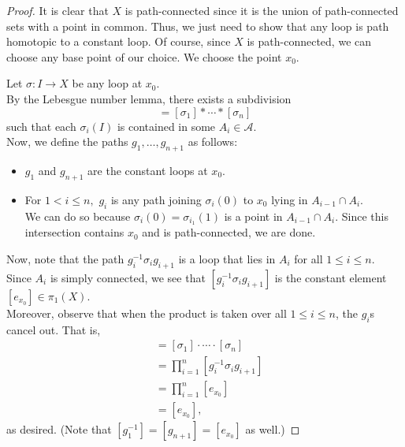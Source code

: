 \documentclass[12pt]{article}
\theoremstyle{definition}
\numberwithin{thm}{section}
\begin{document}
\begin{proof} 
	It is clear that $X$ is path-connected since it is the union of path-connected sets with a point in common. Thus, we just need to show that any loop is path homotopic to a constant loop. Of course, since $X$ is path-connected, we can choose any base point of our choice. We choose the point $x_0.$ 

	Let $\sigma:I \to X$ be any loop at $x_0.$\\
	By the Lebesgue number lemma, there exists a subdivision
	\begin{equation*} 
		[\sigma] = [\sigma_1]*\cdots*[\sigma_n]
	\end{equation*}
	such that each $\sigma_i(I)$ is contained in some $A_i \in \mathcal{A}.$ \\
	Now, we define the paths $g_1, \ldots, g_{n+1}$ as follows:
	\begin{itemize}
		\item $g_1$ and $g_{n+1}$ are the constant loops at $x_0.$
		\item For $1 < i \le n,$ $g_i$ is any path joining $\sigma_i(0)$ to $x_0$ lying in $A_{i-1} \cap A_i.$ \\
		We can do so because $\sigma_i(0) = \sigma_{i_1}(1)$ is a point in $A_{i-1} \cap A_i.$ Since this intersection contains $x_0$ and is path-connected, we are done.
	\end{itemize}
	Now, note that the path $g_i^{-1}\sigma_ig_{i+1}$ is a loop that lies in $A_i$ for all $1 \le i \le n.$ Since $A_i$ is simply connected, we see that $[g_i^{-1}\sigma_ig_{i+1}]$ is the constant element $[e_{x_0}] \in \pi_1(X).$\\
	Moreover, observe that when the product is taken over all $1 \le i \le n$, the $g_i$s cancel out. That is,
	\begin{align*} 
		[\sigma] &= [\sigma_1]\cdot\cdots\cdot[\sigma_n]\\
		&= \prod_{i = 1}^{n}[g_i^{-1}\sigma_ig_{i+1}]\\
		&= \prod_{i = 1}^{n}[e_{x_0}]\\
		&= [e_{x_0}],
	\end{align*}
	as desired. (Note that $[g_1^{-1}] = [g_{n+1}] = [e_{x_0}]$ as well.)
\end{proof}
\end{document}
